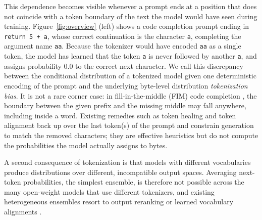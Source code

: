 \documentclass{article} %
\newcommand{\tok}[1]{\texttt{#1}}
\begin{document}
This dependence becomes visible whenever a prompt ends at a position that does not coincide with a token boundary of the text the model would have seen during training. Figure~\ref{fig:overview} (left) shows a code completion prompt ending in \tok{return 5 + a}, whose correct continuation is the character \tok{a}, completing the argument name \tok{aa}. Because the tokenizer would have encoded \tok{aa} as a single token, the model has learned that the token \tok{a} is never followed by another \tok{a}, and assigns probability $0.0$ to the correct next character. We call this discrepancy between the conditional distribution of a tokenized model given one deterministic encoding of the prompt and the underlying byte-level distribution \emph{tokenization bias}. It is not a rare corner case: in fill-in-the-middle (FIM) code completion \citep{bavarian2022fim,fried2023incoder}, the boundary between the given prefix and the missing middle may fall anywhere, including inside a word. Existing remedies such as token healing \citep{dagan2024tokenizer} and token alignment \citep{athiwaratkun2024alignment} back up over the last token(s) of the prompt and constrain generation to match the removed characters; they are effective heuristics but do not compute the probabilities the model actually assigns to bytes.

A second consequence of tokenization is that models with different vocabularies produce distributions over different, incompatible output spaces. Averaging next-token probabilities, the simplest ensemble, is therefore not possible across the many open-weight models that use different tokenizers, and existing heterogeneous ensembles resort to output reranking or learned vocabulary alignments \citep{jiang2023llmblender,huang2024deepen,yu2024gac}.
\end{document}
